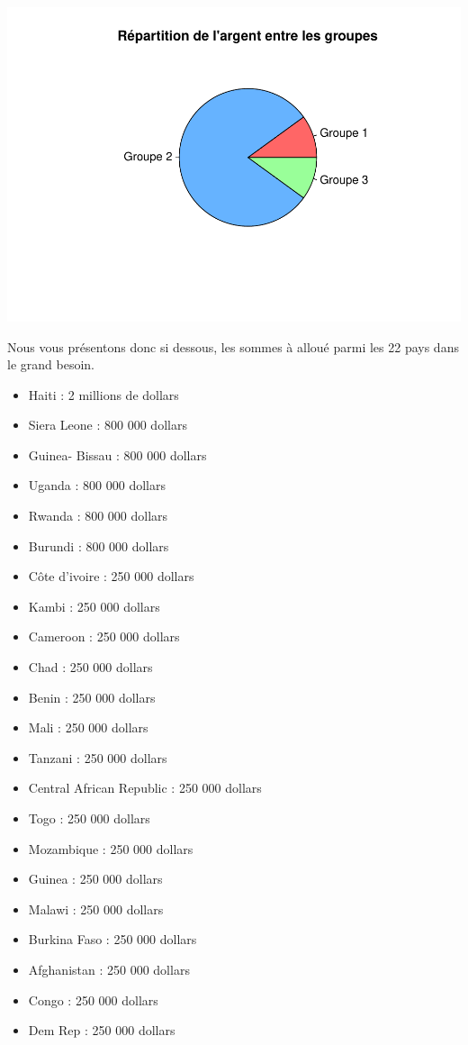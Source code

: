 \documentclass[
]{article}
\providecommand{\tightlist}{%
  \setlength{\itemsep}{0pt}\setlength{\parskip}{0pt}}
\begin{document}
\includegraphics{Projet_files/figure-latex/unnamed-chunk-48-1.pdf}

Nous vous présentons donc si dessous, les sommes à alloué parmi les 22
pays dans le grand besoin.

\begin{itemize}
\tightlist
\item
  Haiti : 2 millions de dollars
\item
  Siera Leone : 800 000 dollars
\item
  Guinea- Bissau : 800 000 dollars
\item
  Uganda : 800 000 dollars
\item
  Rwanda : 800 000 dollars
\item
  Burundi : 800 000 dollars
\item
  Côte d'ivoire : 250 000 dollars
\item
  Kambi : 250 000 dollars
\item
  Cameroon : 250 000 dollars
\item
  Chad : 250 000 dollars
\item
  Benin : 250 000 dollars
\item
  Mali : 250 000 dollars
\item
  Tanzani : 250 000 dollars
\item
  Central African Republic : 250 000 dollars
\item
  Togo : 250 000 dollars
\item
  Mozambique : 250 000 dollars
\item
  Guinea : 250 000 dollars
\item
  Malawi : 250 000 dollars
\item
  Burkina Faso : 250 000 dollars
\item
  Afghanistan : 250 000 dollars
\item
  Congo : 250 000 dollars
\item
  Dem Rep : 250 000 dollars
\end{itemize}
\end{document}
